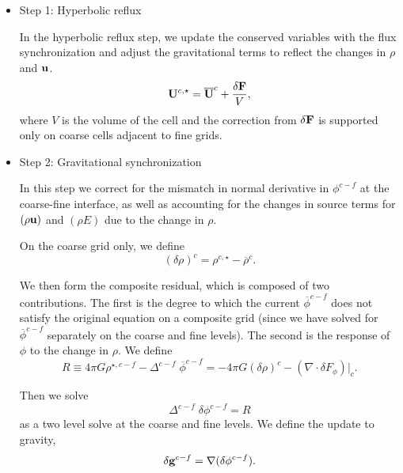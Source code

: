 \begin{itemize}
\item Step 1:  Hyperbolic reflux

In the hyperbolic reflux step, we update the conserved variables with the flux synchronization
and adjust the gravitational terms to reflect the changes in $\rho$ and ${\bf u}$.
\begin{equation}
{{\bf U}}^{c, \star} = \overline{{\bf U}}^{c} + \frac{\delta{\bf F}}{V},
\end{equation}
where $V$ is the volume of the cell and the correction from $\delta{\bf F}$ is supported only on coarse cells adjacent to fine grids.   

\item Step 2:  Gravitational synchronization

In this step we correct for the mismatch in normal derivative in $\phi^{c-f}$ at the coarse-fine
interface, as well as accounting for the changes in source terms for $(\rho {\bf u})$
and $(\rho E)$ due to the change in $\rho.$

On the coarse grid only, we define
\begin{equation}
(\delta \rho)^{c} =  \rho^{c, \star} - {\overline{\rho}}^{c}  .
\end{equation}

We then form the composite residual, which is composed of two contributions.
The first is the degree to which the current $ \overline{\phi}^{c-f}$
does not satisfy the original equation on a composite grid (since we have solved for 
$\overline{\phi}^{c-f}$ separately on the coarse and fine levels).  The second
is the response of $\phi$ to the change in $\rho.$
We define 
\begin{equation} R \equiv  4 \pi G \rho^{\star,c-f} - \Delta^{c-f} \; \overline{\phi}^{c-f} 
= - 4 \pi G (\delta \rho)^c - (\nabla \cdot \delta F_\phi ) |_c   .
\end{equation}

Then we solve
\begin{equation}
 \Delta^{c-f} \; \delta \phi^{c-f} = R
\label{eq:gravsync}
\end{equation}
as a two level solve at the coarse and fine levels.  
We define the update to gravity,
\begin{equation}
\delta {\bf g}^{c-f} = \nabla (\delta \phi^{c-f})  .
\end{equation}


\end{itemize}
